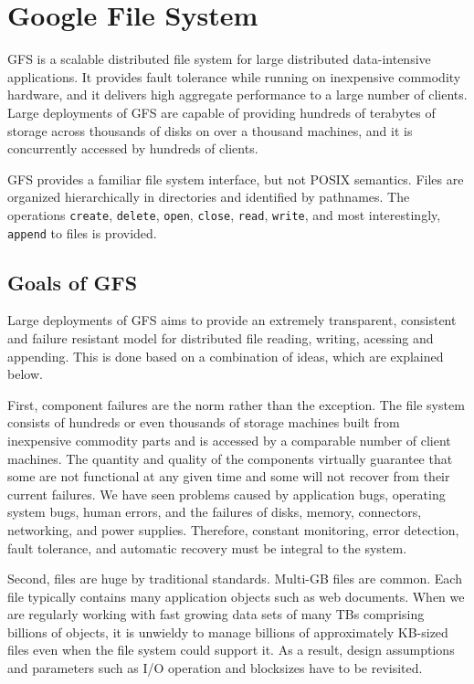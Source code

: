 \documentclass{article}
\begin{document}
\section{Google File System}

GFS is a scalable distributed file system for large distributed data-intensive applications. It provides fault tolerance while running on inexpensive commodity hardware, and it delivers high aggregate performance to a large number of clients. Large deployments of GFS are capable of providing hundreds of terabytes of storage across thousands of disks on over a thousand machines, and it is concurrently accessed by hundreds of clients.

GFS provides a familiar file system interface, but not POSIX semantics.  Files are organized hierarchically in directories and identified by pathnames. The operations \texttt{create},  \texttt{delete}, \texttt{open}, \texttt{close}, \texttt{read}, \texttt{write}, and most interestingly, \texttt{append} to files is provided.



\subsection{Goals of GFS}

Large deployments of GFS aims to provide an extremely transparent, consistent and failure resistant model for distributed file reading, writing, acessing and appending. This is done based on a combination of ideas, which are explained below.

First, component failures are the norm rather than the exception. The file system consists of hundreds or even thousands of storage machines built from inexpensive commodity parts and is accessed by a comparable number of client machines. The quantity and quality of the components virtually guarantee that some are not functional at any given time and some will not recover from their current failures. We have seen problems caused by application bugs, operating system bugs, human errors, and the failures of disks, memory, connectors, networking, and power supplies. Therefore, constant monitoring, error detection, fault tolerance, and automatic recovery must be integral to the system.

Second, files are huge by traditional standards. Multi-GB files are common. Each file typically contains many application objects such as web documents. When we are regularly working with fast growing data sets of many TBs comprising billions of objects, it is unwieldy to manage billions of approximately KB-sized files even when the file system could support it. As a result, design assumptions and parameters such as I/O operation and blocksizes have to be revisited.
\end{document}
